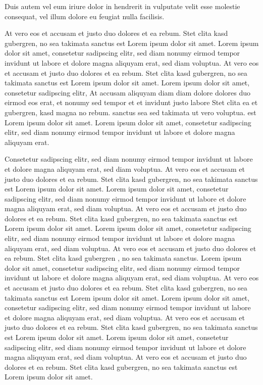Duis autem vel eum iriure dolor in hendrerit in vulputate velit esse molestie consequat, vel illum dolore eu feugiat
nulla facilisis.

At vero eos et accusam et justo duo dolores et ea rebum. Stet clita kasd gubergren, no sea takimata sanctus est Lorem
ipsum dolor sit amet. Lorem ipsum dolor sit amet, consetetur sadipscing elitr, sed diam nonumy eirmod tempor invidunt
ut labore et dolore magna aliquyam erat, sed diam voluptua. At vero eos et accusam et justo duo dolores et ea rebum.
Stet clita kasd gubergren, no sea takimata sanctus est Lorem ipsum dolor sit amet. Lorem ipsum dolor sit amet,
consetetur sadipscing elitr, At accusam aliquyam diam diam dolore dolores duo eirmod eos erat, et nonumy sed tempor
et et invidunt justo labore Stet clita ea et gubergren, kasd magna no rebum. sanctus sea sed takimata ut vero
voluptua. est Lorem ipsum dolor sit amet. Lorem ipsum dolor sit amet, consetetur sadipscing elitr, sed diam nonumy
eirmod tempor invidunt ut labore et dolore magna aliquyam erat.

Consetetur sadipscing elitr, sed diam nonumy eirmod tempor invidunt ut labore et dolore magna aliquyam erat, sed diam
voluptua. At vero eos et accusam et justo duo dolores et ea rebum. Stet clita kasd gubergren, no sea takimata sanctus
est Lorem ipsum dolor sit amet. Lorem ipsum dolor sit amet, consetetur sadipscing elitr, sed diam nonumy eirmod
tempor invidunt ut labore et dolore magna aliquyam erat, sed diam voluptua. At vero eos et accusam et justo duo
dolores et ea rebum. Stet clita kasd gubergren, no sea takimata sanctus est Lorem ipsum dolor sit amet. Lorem ipsum
dolor sit amet, consetetur sadipscing elitr, sed diam nonumy eirmod tempor invidunt ut labore et dolore magna
aliquyam erat, sed diam voluptua. At vero eos et accusam et justo duo dolores et ea rebum. Stet clita kasd gubergren
, no sea takimata sanctus. Lorem ipsum dolor sit amet, consetetur sadipscing elitr, sed diam nonumy eirmod tempor
invidunt ut labore et dolore magna aliquyam erat, sed diam voluptua. At vero eos et accusam et justo duo dolores et
ea rebum. Stet clita kasd gubergren, no sea takimata sanctus est Lorem ipsum dolor sit amet. Lorem ipsum dolor sit
amet, consetetur sadipscing elitr, sed diam nonumy eirmod tempor invidunt ut labore et dolore magna aliquyam erat,
sed diam voluptua. At vero eos et accusam et justo duo dolores et ea rebum. Stet clita kasd gubergren, no sea
takimata sanctus est Lorem ipsum dolor sit amet. Lorem ipsum dolor sit amet, consetetur sadipscing elitr, sed diam
nonumy eirmod tempor invidunt ut labore et dolore magna aliquyam erat, sed diam voluptua. At vero eos et accusam et
justo duo dolores et ea rebum. Stet clita kasd gubergren, no sea takimata sanctus est Lorem ipsum dolor sit amet.

